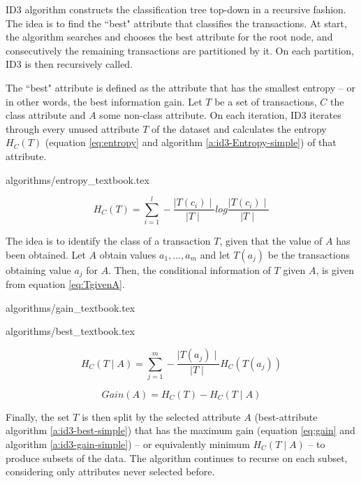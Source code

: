 ID3 algorithm constructs the classification tree top-down in a recursive fashion.
The idea is to find the ``best" attribute that classifies the transactions.
At start, the algorithm searches and chooses the best attribute for the root node, and consecutively the remaining transactions are partitioned by it.
On each partition, ID3 is then recursively called.

The ``best" attribute is defined as the attribute that has the smallest entropy -- or in other words, the best information gain.
Let $T$ be a set of transactions, $C$ the class attribute and $A$ some non-class attribute.
On each iteration, ID3 iterates through every unused attribute $T$ of the dataset and calculates the entropy $H_C(T)$ (equation \ref{eq:entropy} and algorithm \ref{a:id3-Entropy-simple}) of that attribute.

{algorithms/entropy_textbook.tex}

\begin{equation}\label{eq:entropy}
  H_C(T) = \sum_{i=1}^{l} - \frac{\mid T(c_i) \mid}{\mid T \mid} log{\frac{\mid T(c_i) \mid}{\mid T \mid}}
\end{equation}

The idea is to identify the class of a transaction $T$, given that the value of $A$ has been obtained.
Let $A$ obtain values $a_1, \dots, a_m$ and let $T(a_j)$ be the transactions obtaining value $a_j$ for $A$.
Then, the conditional information of $T$ given $A$, is given from equation \ref{eq:TgivenA}.

{algorithms/gain_textbook.tex}

{algorithms/best_textbook.tex}

\begin{equation}\label{eq:TgivenA}
  H_C(T \mid A) = \sum_{j=1}^{m} - \frac{\mid T(a_j) \mid}{\mid T \mid} H_C(T(a_j))
\end{equation}

\begin{equation}\label{eq:gain}
  Gain(A) = H_C(T) - H_C(T \mid A)
\end{equation}


Finally, the set $T$ is then split by the selected attribute $A$ (best-attribute algorithm \ref{a:id3-best-simple}) that has the maximum gain (equation \ref{eq:gain} and algorithm \ref{a:id3-gain-simple}) -- or equivalently minimum $H_C(T \mid A)$ -- to produce subsets of the data.
The algorithm continues to recurse on each subset, considering only attributes never selected before.


